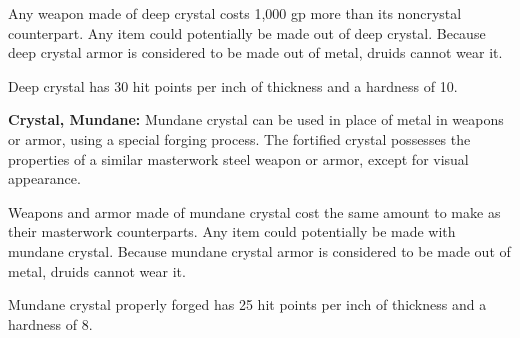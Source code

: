\documentclass{article}
\begin{document}
Any weapon made of deep crystal costs 1,000 gp more than its noncrystal counterpart. 
Any item could potentially be made out of deep crystal. Because deep crystal armor 
is considered to be made out of metal, druids cannot wear it.

Deep crystal has 30 hit points per inch of thickness and a hardness of 10.

\textbf{Crystal, Mundane:} Mundane crystal can be used in place of metal in weapons 
or armor, using a special forging process. The fortified crystal possesses the 
properties of a similar masterwork steel weapon or armor, except for visual appearance.

Weapons and armor made of mundane crystal cost the same amount to make as their 
masterwork counterparts. Any item could potentially be made with mundane crystal. 
Because mundane crystal armor is considered to be made out of metal, druids cannot 
wear it.

Mundane crystal properly forged has 25 hit points per inch of thickness and a hardness 
of 8.

\newpage
\end{document}
